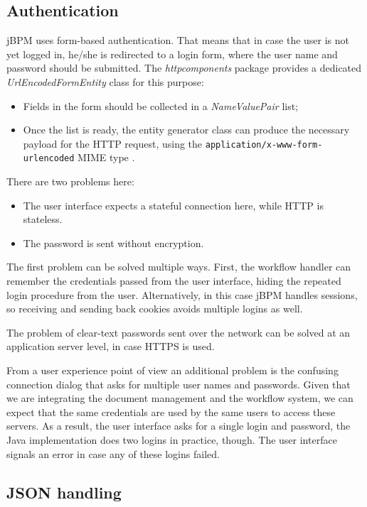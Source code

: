 \subsection{Authentication}

jBPM uses form-based authentication. That means that in case the user is not
yet logged in, he/she is redirected to a login form, where the user name and
password should be submitted. The \emph{httpcomponents} package provides a
dedicated \emph{UrlEncodedFormEntity} class for this purpose:

\begin{itemize}
\item Fields in the form should be collected in a \emph{NameValuePair} list;
\item Once the list is ready, the entity generator class can produce the
necessary payload for the HTTP request, using the
\texttt{application/x-www-form-urlencoded} MIME type \cite{form-encoding}.
\end{itemize}

There are two problems here:

\begin{itemize}
\item The user interface expects a stateful connection here, while HTTP is stateless.
\item The password is sent without encryption.
\end{itemize}

The first problem can be solved multiple ways. First, the workflow handler can
remember the credentials passed from the user interface, hiding the repeated
login procedure from the user. Alternatively, in this case jBPM handles
sessions, so receiving and sending back cookies avoids multiple logins as well.

The problem of clear-text passwords sent over the network can be solved at an
application server level, in case HTTPS is used.

From a user experience point of view an additional problem is the confusing
connection dialog that asks for multiple user names and passwords. Given that
we are integrating the document management and the workflow system, we can
expect that the same credentials are used by the same users to access these
servers. As a result, the user interface asks for a single login and password,
the Java implementation does two logins in practice, though. The user interface
signals an error in case any of these logins failed.

\subsection{JSON handling}

